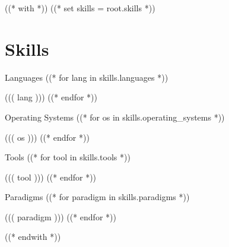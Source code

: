 ((* with *))
((* set skills = root.skills *))
\section{Skills}\relax
    \vspace{-2em} %
    \begin{multicols}{2}
        \begin{csitemize}{Languages}
        ((* for lang in skills.languages *))
            \item ((( lang )))
        ((* endfor *))
        \end{csitemize}

        \begin{csitemize}{Operating Systems}
        ((* for os in skills.operating_systems *))
            \item ((( os )))
        ((* endfor *))
        \end{csitemize}

        \begin{csitemize}{Tools}
        ((* for tool in skills.tools *))
            \item ((( tool )))
        ((* endfor *))
        \end{csitemize}

        \begin{csitemize}{Paradigms}
        ((* for paradigm in skills.paradigms *))
            \item ((( paradigm )))
        ((* endfor *))
        \end{csitemize}
    \end{multicols}
((* endwith *))
